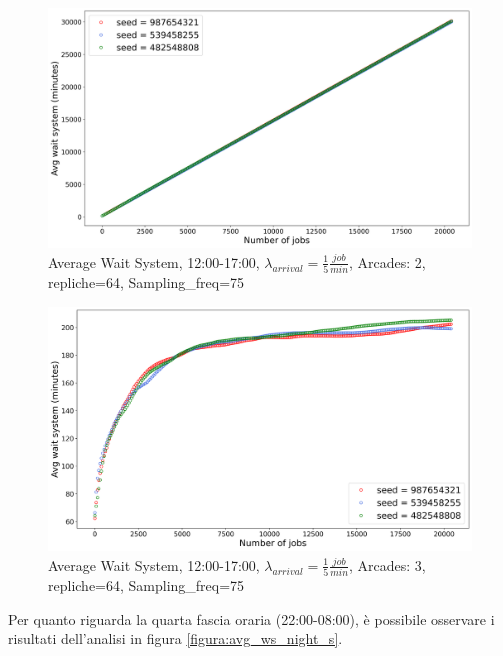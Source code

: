 \documentclass{article}
\begin{document}
\begin{figure}[H]
\centering
\captionsetup{justification=centering,margin=2cm}
\includegraphics[scale=0.48]{images/transient_aft_ns.png}
\caption{Average Wait System, 12:00-17:00, $\lambda_{arrival}=\frac{1}{5} \frac{job}{min}$, Arcades: 2, repliche=64, Sampling\_freq=75}\label{figura:avg_ws_aft_ns}
\end{figure}
\begin{figure}[H]
\centering
\captionsetup{justification=centering,margin=2cm}
\includegraphics[scale=0.48]{images/transient_aft_s.png}
\caption{Average Wait System, 12:00-17:00, $\lambda_{arrival}=\frac{1}{5} \frac{job}{min}$, Arcades: 3, repliche=64, Sampling\_freq=75}\label{figura:avg_ws_aft_s}
\end{figure}


Per quanto riguarda la quarta fascia oraria (22:00-08:00), è possibile osservare i risultati dell'analisi in figura \ref{figura:avg_ws_night_s}.
\end{document}
